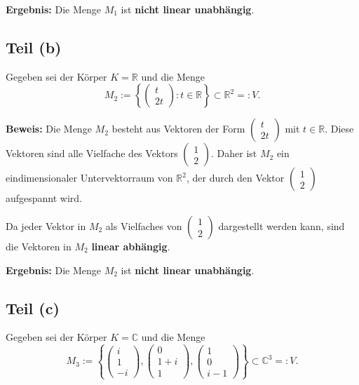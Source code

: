 \documentclass[11pt]{article}
\begin{document}
\textbf{Ergebnis:} Die Menge \( M_1 \) ist \textbf{nicht linear unabhängig}.

\subsection*{Teil (b)}

Gegeben sei der Körper \( K = \mathbb{R} \) und die Menge
\[
M_2 := \left\{ \begin{pmatrix} t \\ 2t \end{pmatrix} : t \in \mathbb{R} \right\} \subset \mathbb{R}^2 =: V.
\]

\textbf{Beweis:} Die Menge \( M_2 \) besteht aus Vektoren der Form \( \begin{pmatrix} t \\ 2t \end{pmatrix} \) mit \( t \in \mathbb{R} \). Diese Vektoren sind alle Vielfache des Vektors \( \begin{pmatrix} 1 \\ 2 \end{pmatrix} \). Daher ist \( M_2 \) ein eindimensionaler Untervektorraum von \( \mathbb{R}^2 \), der durch den Vektor \( \begin{pmatrix} 1 \\ 2 \end{pmatrix} \) aufgespannt wird.

Da jeder Vektor in \( M_2 \) als Vielfaches von \( \begin{pmatrix} 1 \\ 2 \end{pmatrix} \) dargestellt werden kann, sind die Vektoren in \( M_2 \) \textbf{linear abhängig}.

\textbf{Ergebnis:} Die Menge \( M_2 \) ist \textbf{nicht linear unabhängig}.

\subsection*{Teil (c)}

Gegeben sei der Körper \( K = \mathbb{C} \) und die Menge
\[
M_3 := \left\{ \begin{pmatrix} i \\ 1 \\ -i \end{pmatrix}, \begin{pmatrix} 0 \\ 1 + i \\ 1 \end{pmatrix}, \begin{pmatrix} 1 \\ 0 \\ i - 1 \end{pmatrix} \right\} \subset \mathbb{C}^3 =: V.
\]
\end{document}
